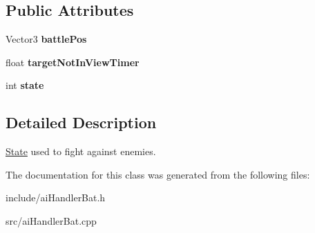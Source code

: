\subsection*{\-Public \-Attributes}
\begin{DoxyCompactItemize}
\item 
\hypertarget{classAIStateBatCombat_aa9ac4871e7e8884c3b1bc9b125cc251b}{
\-Vector3 {\bfseries battle\-Pos}}
\label{df/d66/classAIStateBatCombat_aa9ac4871e7e8884c3b1bc9b125cc251b}

\item 
\hypertarget{classAIStateBatCombat_af5d66b0cad0dd3c94d120e78698e438f}{
float {\bfseries target\-Not\-In\-View\-Timer}}
\label{df/d66/classAIStateBatCombat_af5d66b0cad0dd3c94d120e78698e438f}

\item 
\hypertarget{classAIStateBatCombat_adb617edf2e67cad430c15fb296233ea0}{
int {\bfseries state}}
\label{df/d66/classAIStateBatCombat_adb617edf2e67cad430c15fb296233ea0}

\end{DoxyCompactItemize}


\subsection{\-Detailed \-Description}
\hyperlink{classState}{\-State} used to fight against enemies. 

\-The documentation for this class was generated from the following files\-:\begin{DoxyCompactItemize}
\item 
include/ai\-Handler\-Bat.\-h\item 
src/ai\-Handler\-Bat.\-cpp\end{DoxyCompactItemize}
